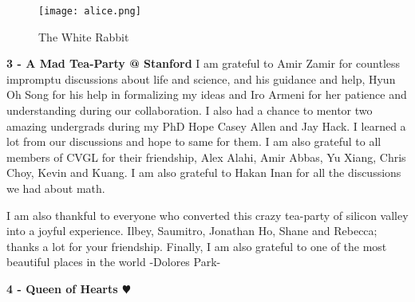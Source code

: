 \begin{wrapfigure}{r}{0.25\textwidth}
\texttt{[image: alice.png]}
\caption{The White Rabbit \cite{aiw}}
\end{wrapfigure}

\noindent \textbf{3 - A Mad Tea-Party @ Stanford}
I am grateful to Amir Zamir for countless impromptu discussions about life and science, and his guidance and help, Hyun Oh Song for his help in formalizing my ideas and Iro Armeni for her patience and understanding during our collaboration. I also had a chance to mentor two amazing undergrads during my PhD Hope Casey Allen and Jay Hack. I learned a lot from our discussions and hope to same for them. I am also grateful to all members of CVGL for their friendship, Alex Alahi, Amir Abbas, Yu Xiang, Chris Choy, Kevin and Kuang. I am also grateful to Hakan Inan for all the discussions we had about math. 

I am also thankful to everyone who converted this crazy tea-party of silicon valley into a joyful experience. Ilbey, Saumitro, Jonathan Ho, Shane and Rebecca; thanks a lot for your friendship. Finally, I am also grateful to one of the most beautiful places in the world -Dolores Park-

\noindent \textbf{4 - Queen of Hearts $\varheart$}
\iffalse
\noindent ---~ \textbf{Lion:} ``Hello, Fox. Why are you looking so gloomy?''

\noindent ---~ \textbf{Fox:} ``It's been like this all week. First my cub got sick, then the car started making a funny noise, and last night I accidently put my watch through the washing machine and it quit working.''

\noindent ---~ \textbf{Lion:} ``Well, I can't do much about the child or the car, but I can fix your watch for you.''

\noindent ---~ \textbf{Fox:} ``That'll be the day. You with your big claws? You would have trouble picking up the watch, let alone fixing the insides. You'll just break it even worse than it already is. I'd better take it into town.''

\noindent ---~ \textbf{Lion:} ``Let me take it into my den for a couple minutes. You'll be suprized.''

So he disappears into his den with the watch. A few minutes later he returns: the watch is fixed.

\textbf{Scene inside the lion's den:} In one corner, next to the coffee machine, is a smug-looking lion lying on a couch cleaning his fur. In a second corner, there are seven industrious rabbits surrounded by tiny parts and precision tools.  It doesn't matter whether you can write working programs or prove theorems. It doesn't matter whether you can do a slick demo or generate pretty pictures. What really matters is whether your graduate students can.
\fi 
